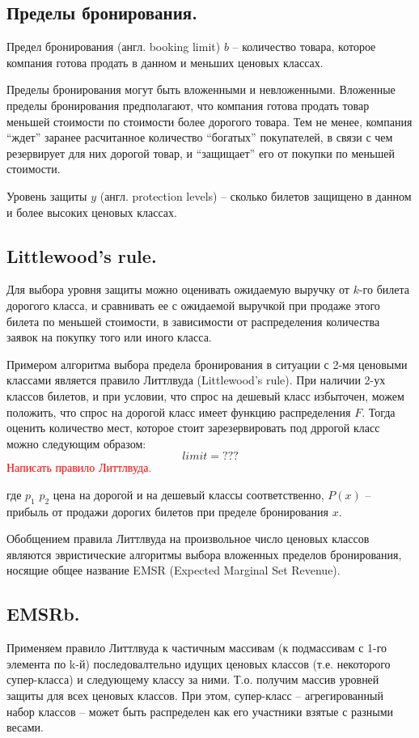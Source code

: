 \documentclass[reqno]{article}
\theoremstyle{definition}
\theoremstyle{definition}
\theoremstyle{definition}
\theoremstyle{definition}
\theoremstyle{definition}
\theoremstyle{definition}
\theoremstyle{definition}
\theoremstyle{definition}
\theoremstyle{definition}
\begin{document}
		
		\subsection{Пределы бронирования.}
				
		Предел бронирования (англ. booking limit) $b$ -- количество товара, которое компания готова продать в данном и меньших ценовых классах.
	
		Пределы бронирования могут быть вложенными и невложенными. Вложенные пределы бронирования предполагают, что компания готова продать товар меньшей стоимости по стоимости более дорогого товара. Тем не менее, компания ``ждет'' заранее расчитанное количество ``богатых'' покупателей, в связи с чем резервирует для них дорогой товар, и ``защищает'' его от покупки по меньшей стоимости.
		
		Уровень защиты $y$ (англ. protection levels) -- сколько билетов защищено в данном и более высоких ценовых классах.
		
		\subsection{Littlewood's rule.}
		
		Для выбора уровня защиты можно оценивать ожидаемую выручку от $k$-го билета дорогого класса, и сравнивать ее с ожидаемой выручкой при продаже этого билета по меньшей стоимости, в зависимости от распределения количества заявок на покупку того или иного класса.
		
		Примером алгоритма выбора предела бронирования в ситуации с 2-мя ценовыми классами является правило Литтлвуда (Littlewood's rule). При наличии 2-ух классов билетов, и при условии, что спрос на дешевый класс избыточен, можем положить, что спрос на дорогой класс имеет функцию распределения ${F}$. Тогда оценить количество мест, которое стоит зарезервировать под дррогой класс можно следующим образом:
		$$limit = ???$$
		\textcolor{red}{Написать правило Литтлвуда.}
		
		где $p_1$ $p_2$ цена на дорогой и на дешевый классы соответственно, $P(x)$ -- прибыль от продажи дорогих билетов при пределе бронирования $x$.
		
		Обобщением правила Литтлвуда на произвольное число ценовых классов являются эвристические алгоритмы выбора вложенных пределов бронирования, носящие общее название EMSR (Expected Marginal Set Revenue).
		
		
		\subsection{EMSRb.}		
		Применяем правило Литтлвуда к частичным массивам (к подмассивам с 1-го элемента по k-й) последовалтельно идущих ценовых классов (т.е. некоторого супер-класса) и следующему классу за ними. Т.о. получим массив уровней защиты для всех ценовых классов. При этом, супер-класс -- агрегированный набор классов -- может быть распределен как его участники взятые с разными весами.	
		
\end{document}
